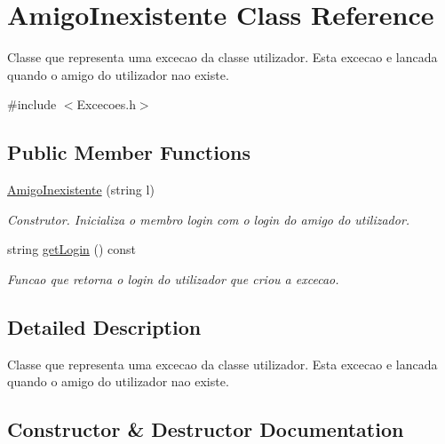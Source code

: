 \hypertarget{class_amigo_inexistente}{}\section{Amigo\+Inexistente Class Reference}
\label{class_amigo_inexistente}


Classe que representa uma excecao da classe utilizador. Esta excecao e lancada quando o amigo do utilizador nao existe.  




{\ttfamily \#include $<$Excecoes.\+h$>$}

\subsection*{Public Member Functions}
\begin{DoxyCompactItemize}
\item 
\hyperlink{class_amigo_inexistente_a214d9d7a9579e42d67f8c7fe290958f3}{Amigo\+Inexistente} (string l)
\begin{DoxyCompactList}\small\item\em Construtor. Inicializa o membro login com o login do amigo do utilizador. \end{DoxyCompactList}\item 
string \hyperlink{class_amigo_inexistente_a72d6ea60bacc6a8deacefc1f130ce883}{get\+Login} () const 
\begin{DoxyCompactList}\small\item\em Funcao que retorna o login do utilizador que criou a excecao. \end{DoxyCompactList}\end{DoxyCompactItemize}


\subsection{Detailed Description}
Classe que representa uma excecao da classe utilizador. Esta excecao e lancada quando o amigo do utilizador nao existe. 

\subsection{Constructor \& Destructor Documentation}
\hypertarget{class_amigo_inexistente_a214d9d7a9579e42d67f8c7fe290958f3}{}
